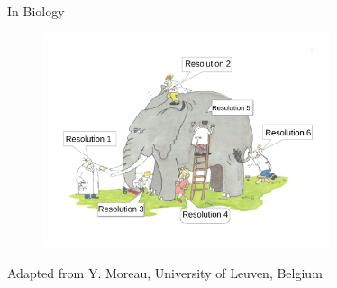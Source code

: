 \documentclass[utf8, a4paper]{beamer}
\begin{document}
\begin{frame} {In Biology} 

\vspace{-0.9cm}

\begin{figure}
\centering
  \includegraphics[trim={1cm 1.7cm 1cm 1.7cm},clip, width=0.75\textwidth]{images/elebio_n1}
\end{figure}

\vspace{-1mm}

\tiny Adapted from Y. Moreau, University of Leuven, Belgium

\end{frame}
\end{document}
